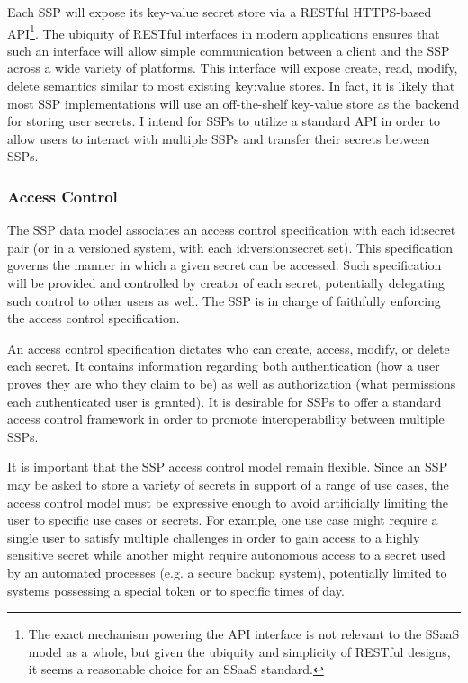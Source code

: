 Each SSP will expose its key-value secret store via a RESTful
HTTPS-based API\footnote{The exact mechanism powering the API
  interface is not relevant to the SSaaS model as a whole, but given
  the ubiquity and simplicity of RESTful designs, it seems a
  reasonable choice for an SSaaS standard.}. The ubiquity of RESTful
interfaces in modern applications ensures that such an interface will
allow simple communication between a client and the SSP across a wide
variety of platforms. This interface will expose create, read, modify,
delete semantics similar to most existing key:value stores. In fact,
it is likely that most SSP implementations will use an off-the-shelf
key-value store as the backend for storing user secrets. I intend for
SSPs to utilize a standard API in order to allow users to interact with
multiple SSPs and transfer their secrets between SSPs.

\subsubsection{Access Control}

The SSP data model associates an access control specification with
each id:secret pair (or in a versioned system, with each
id:version:secret set). This specification governs the manner in which
a given secret can be accessed. Such specification will be provided
and controlled by creator of each secret, potentially delegating such
control to other users as well. The SSP is in charge of faithfully
enforcing the access control specification.

An access control specification dictates who can create, access,
modify, or delete each secret. It contains information regarding both
authentication (how a user proves they are who they claim to be) as
well as authorization (what permissions each authenticated user is
granted). It is desirable for SSPs to offer a standard access control
framework in order to promote interoperability between multiple SSPs.

It is important that the SSP access control model remain
flexible. Since an SSP may be asked to store a variety of secrets in
support of a range of use cases, the access control model must be
expressive enough to avoid artificially limiting the user to specific
use cases or secrets. For example, one use case might require a single
user to satisfy multiple challenges in order to gain access to a
highly sensitive secret while another might require autonomous access
to a secret used by an automated processes (e.g. a secure backup
system), potentially limited to systems possessing a special token or
to specific times of day.


